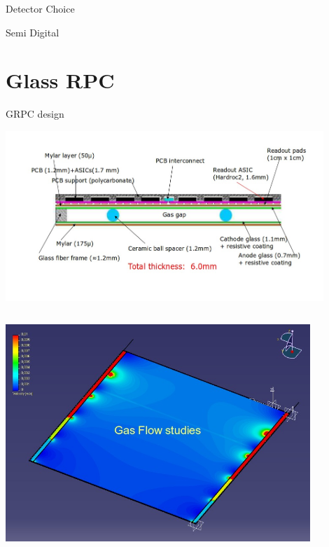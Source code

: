 \documentclass[10pt]{beamer}
\begin{document}
\begin{frame}{Detector Choice}
\begin{block}{  Semi Digital}
  \end{block} 

\end{frame}
\section{Glass RPC }
\begin{frame}{GRPC design}

  \centerline{\includegraphics[width=0.9\textwidth,height=0.4\textheight]{jpg/GRPCSchema}}
  \pause   

  \begin{columns}
    \begin{column}{0.45\textwidth}
      \centerline{\includegraphics[width=0.9\textwidth]{jpg/GasFlow}}
    \end{column}
    \pause
    \begin{column}{0.45\textwidth}


\end{column}
\end{columns}
\end{frame}
\end{document}
